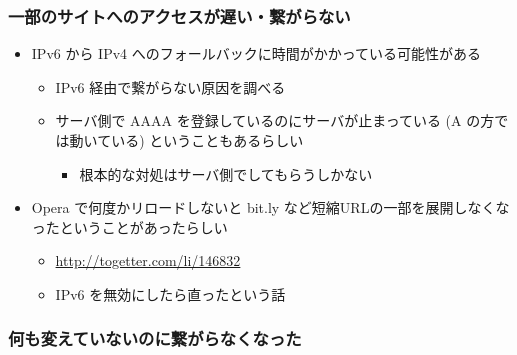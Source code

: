 \documentclass[mingoth,a4paper]{jsarticle}
\begin{document}
\subsubsection{一部のサイトへのアクセスが遅い・繋がらない}

\begin{itemize}
\item IPv6 から IPv4 へのフォールバックに時間がかかっている可能性がある

\begin{itemize}
\item IPv6 経由で繋がらない原因を調べる
\item サーバ側で AAAA を登録しているのにサーバが止まっている (A の方では動いている) ということもあるらしい

\begin{itemize}
\item 根本的な対処はサーバ側でしてもらうしかない
\end{itemize}

\end{itemize}

\item Opera で何度かリロードしないと bit.ly など短縮URLの一部を展開しなくなったということがあったらしい

\begin{itemize}
\item \url{http://togetter.com/li/146832}
\item IPv6 を無効にしたら直ったという話
\end{itemize}

\end{itemize}
\subsubsection{何も変えていないのに繋がらなくなった}
\end{document}
